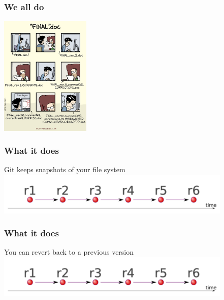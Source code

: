 \documentclass{beamer}
\begin{document}
\begin{frame}
\frametitle{We all do}
 \includegraphics[height=5.7cm]{figures/vcs_for_science.png}
\end{frame}




\begin{frame}
\frametitle{What it does}
Git keeps snapshots of your file system
\includegraphics[height=2cm]{figures/git1.pdf}
\end{frame}

\begin{frame}
\frametitle{What it does}
You can revert back to a previous version
\includegraphics[height=2cm]{figures/git1.pdf}
\end{frame}
\end{document}

